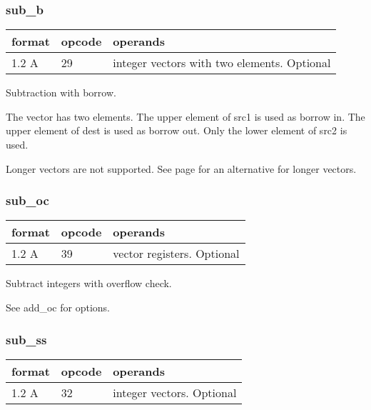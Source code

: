 \documentclass[forwardcom.tex]{subfiles}
\begin{document}
\subsubsection{sub\_b}
\label{table:subBInstruction}
\begin{tabular}{|p{12mm}|p{12mm}|p{110mm}|}
\hline
\bfseries format & \bfseries opcode & \bfseries operands \\ \hline
1.2 A & 29 & integer vectors with two elements. Optional \\ \hline
\end{tabular}
\vspace{2mm}

Subtraction with borrow.
\vspace{2mm}

The vector has two elements. The upper element of src1 is used as borrow in. The upper element of dest is used as borrow out. Only the lower element of src2 is used.
\vspace{2mm}

Longer vectors are not supported. See page 
\pageref{highPrecisionArithmetic} for an alternative for longer vectors.

\subsubsection{sub\_oc}
\label{table:subOcInstruction}
\begin{tabular}{|p{12mm}|p{12mm}|p{110mm}|}
\hline
\bfseries format & \bfseries opcode & \bfseries operands \\ \hline
1.2 A & 39 & vector registers. Optional \\ \hline
\end{tabular}
\vspace{2mm}

Subtract integers with overflow check.

See add\_oc for options.

\subsubsection{sub\_ss}
\label{table:subSsInstruction}
\begin{tabular}{|p{12mm}|p{12mm}|p{110mm}|}
\hline
\bfseries format & \bfseries opcode & \bfseries operands \\ \hline
1.2 A & 32 & integer vectors. Optional \\ \hline
\end{tabular}
\vspace{2mm}
\end{document}
